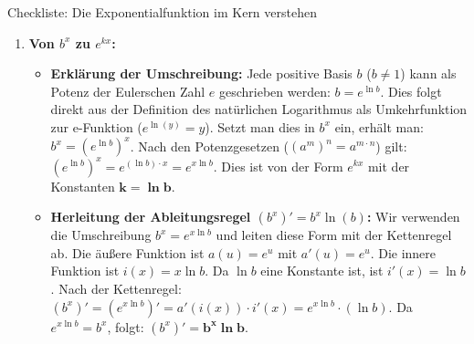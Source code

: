 \begin{loesungsumgebung}{Checkliste: Die Exponentialfunktion im Kern verstehen}
\begin{enumerate}[label=(\alph*)]
    \item \textbf{Von $b^x$ zu $e^{kx}$:}
    \begin{itemize}
        \item \textbf{Erklärung der Umschreibung:}
        Jede positive Basis $b$ ($b \neq 1$) kann als Potenz der Eulerschen Zahl $e$ geschrieben werden: $b = e^{\ln b}$. Dies folgt direkt aus der Definition des natürlichen Logarithmus als Umkehrfunktion zur e-Funktion ($e^{\ln(y)} = y$).
        Setzt man dies in $b^x$ ein, erhält man: $b^x = (e^{\ln b})^x$.
        Nach den Potenzgesetzen ($(a^m)^n = a^{m \cdot n}$) gilt: $(e^{\ln b})^x = e^{(\ln b) \cdot x} = e^{x \ln b}$.
        Dies ist von der Form $e^{kx}$ mit der Konstanten $\mathbf{k = \ln b}$.
        \item \textbf{Herleitung der Ableitungsregel $(b^x)' = b^x \ln(b)$:}
        Wir verwenden die Umschreibung $b^x = e^{x \ln b}$ und leiten diese Form mit der Kettenregel ab.
        Die äußere Funktion ist $a(u) = e^u$ mit $a'(u) = e^u$.
        Die innere Funktion ist $i(x) = x \ln b$. Da $\ln b$ eine Konstante ist, ist $i'(x) = \ln b$.
        Nach der Kettenregel:
        $(b^x)' = (e^{x \ln b})' = a'(i(x)) \cdot i'(x) = e^{x \ln b} \cdot (\ln b)$.
        Da $e^{x \ln b} = b^x$, folgt:
        $(b^x)' = \mathbf{b^x \ln b}$.
    \end{itemize}


\end{enumerate}
\end{loesungsumgebung}
